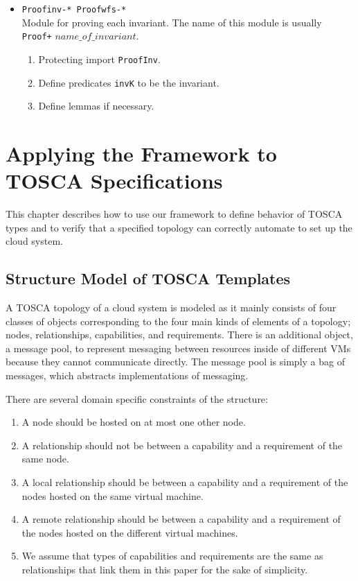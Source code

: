 \documentclass[12pt]{report}
\begin{document}
\begin{itemize}
\begin{enumerate}
  \end{enumerate}
\item {\tt Proofinv-*  Proofwfs-*}\\
  Module for proving each invariant. The name of this module is usually
  {\tt Proof+} $name\_of\_invariant$.
  \begin{enumerate}
  \item Protecting import {\tt ProofInv}.
  \item Define predicates {\tt invK} to be the invariant.
  \item Define lemmas if necessary.
  \end{enumerate}
\end{itemize}

\chapter{Applying the Framework to TOSCA Specifications}
\label{chap:appTOSCA}
This chapter describes how to use our framework to define behavior of
TOSCA types and to verify that a specified topology can correctly
automate to set up the cloud system.

\section{Structure Model of TOSCA Templates}
\label{sec:TOSCAstructure}
A TOSCA topology of a cloud system is modeled as it mainly consists of
four classes of objects corresponding to the four main kinds of
elements of a topology; nodes, relationships, capabilities, and
requirements. There is an additional object, a message pool, to
represent messaging between resources inside of different VMs because
they cannot communicate directly. The message pool is simply a bag of
messages, which abstracts implementations of messaging.

There are several domain specific constraints of the structure:
\begin{enumerate}
\item A node should be hosted on at most one other node.
\item A relationship should not be between a capability and a
  requirement of the same node.
\item A local relationship should be between a capability and a
  requirement of the nodes hosted on the same virtual machine.
\item A remote relationship should be between a capability and a
  requirement of the nodes hosted on the different virtual machines.
\item We assume that types of capabilities and requirements are
  the same as relationships that link them in this paper for the sake
  of simplicity.
\end{enumerate}
\end{document}
